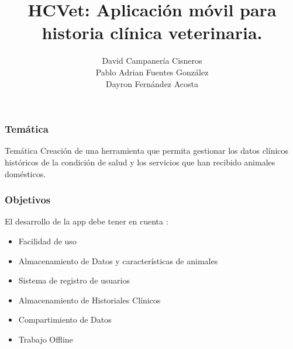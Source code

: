 \documentclass[14pt]{beamer}
\author[Campanería, Fernández, Fuentes]
{David Campanería Cisneros\\Pablo Adrian Fuentes González\\Dayron Fernández Acosta}
\title[Aplicación   HCVet]
{HCVet: Aplicación móvil para historia clínica veterinaria.}
\institute[UH]
{\textbf{Tutores:}\\ José Alejandro Mesejo Chiong\\ José Luis Castañeda Lorenzo}
\begin{document}
\begin{frame}
\titlepage
\end{frame}



\begin{frame}
\frametitle{Temática}
\begin{block}{Temática}
Creación de una herramienta que permita gestionar los datos clínicos históricos de la condición de salud y los servicios que han recibido animales domésticos.

\end{block}

\end{frame}


\begin{frame}
\frametitle{Objetivos}
El desarrollo de la app debe tener en cuenta :
\begin{itemize}
\item Facilidad de uso
\item Almacenamiento de Datos y características de animales
\item Sistema de registro de usuarios
\item Almacenamiento de Historiales Clínicos
\item Compartimiento de Datos 
\item Trabajo Offline

\end{itemize}

\end{frame}
\end{document}
